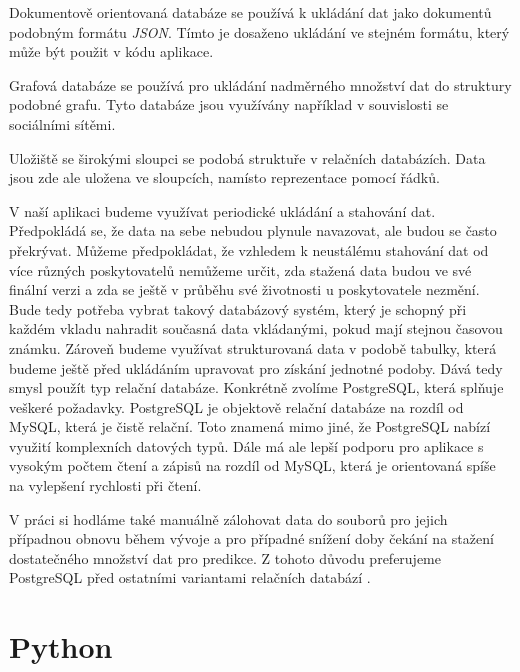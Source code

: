 Dokumentově orientovaná databáze se používá k ukládání dat jako dokumentů podobným formátu \textit{JSON}. 
Tímto je dosaženo ukládání ve stejném formátu, který může být použit v kódu aplikace. 

Grafová databáze se používá pro ukládání nadměrného množství dat do struktury podobné grafu. 
Tyto databáze jsou využívány například v souvislosti se sociálními sítěmi. 

Uložiště se širokými sloupci se podobá struktuře v relačních databázích. 
Data jsou zde ale uložena ve sloupcích, namísto reprezentace pomocí řádků.

V naší aplikaci budeme využívat periodické ukládání a stahování dat. 
Předpokládá se, že data na sebe nebudou plynule navazovat, ale budou se často překrývat. 
Můžeme předpokládat, že vzhledem k neustálému stahování dat od více různých poskytovatelů nemůžeme určit, zda stažená data budou ve své finální verzi a zda se ještě v průběhu své životnosti u poskytovatele nezmění. 
Bude tedy potřeba vybrat takový databázový systém, který je schopný při každém vkladu nahradit současná data vkládanými, pokud mají stejnou časovou známku. 
Zároveň budeme využívat strukturovaná data v podobě tabulky, která budeme ještě před ukládáním upravovat pro získání jednotné podoby. 
Dává tedy smysl použít typ relační databáze. 
Konkrétně zvolíme PostgreSQL, která splňuje veškeré požadavky. 
PostgreSQL je objektově relační databáze na rozdíl od MySQL, která je čistě relační.
Toto znamená mimo jiné, že PostgreSQL nabízí využití komplexních datových typů. 
Dále má ale lepší podporu pro aplikace s vysokým počtem čtení a zápisů na rozdíl od MySQL, která je orientovaná spíše na vylepšení rychlosti při čtení. 

V práci si hodláme také manuálně zálohovat data do souborů pro jejich případnou obnovu během vývoje a pro případné snížení doby čekání na stažení dostatečného množství dat pro predikce. 
Z tohoto důvodu preferujeme PostgreSQL před ostatními variantami relačních databází \cite{postgre-vs-mysql}.

\section{Python}

